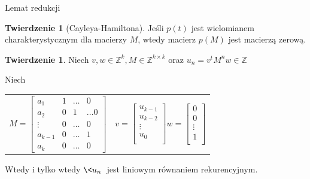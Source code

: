 \documentclass[handout]{beamer}
\def\Z{\mathbb Z}
\theoremstyle{definition}
\newtheorem*{twierdzenie}{Twierdzenie}
\theoremstyle{named}
\newtheorem*{namedtheorem}{Twierdzenie}
\begin{document}
\begin{frame}{Lemat redukcji}

\begin{namedtheorem}[Cayleya-Hamiltona]
    Jeśli $p(t)$ jest wielomianem charakterystycznym dla macierzy $M$, wtedy macierz $p(M)$ jest macierzą zerową. 
\end{namedtheorem}

\begin{twierdzenie}

    Niech $v, w \in \Z^{k}, M \in \Z^{k\times k}$ oraz $u_n = v^{t}M^{n}w \in \Z$
    
    Niech
    \begin{table}[]
        \centering
        \begin{tabular}{c|c}
    $
    M = \begin{bmatrix}
    a_{1} & 1 &  \ldots & 0 \\
    a_{2} & 0 & 1 & \ldots 0  \\
    \vdots & 0 & \ldots & 0 \\ 
    a_{k-1} & 0 & \ldots & 1 \\
    a_{k} & 0 & \ldots & 0
    \end{bmatrix}
    $
             &  
    $v= \begin{bmatrix}
    u_{k-1} \\ u_{k-2} \\ \vdots \\ u_{0} \\
    \end{bmatrix}
    w =  \begin{bmatrix}
    0 \\ 0 \\ \vdots \\ 1 \\
    \end{bmatrix}
    $
             & 
        \end{tabular}

    \end{table}
    
    Wtedy i tylko wtedy $\<u_n\>$ jest liniowym równaniem rekurencyjnym. 

\end{twierdzenie}

\end{frame}
\end{document}
